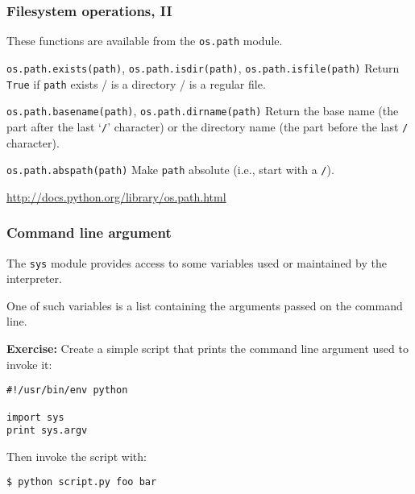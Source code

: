 \documentclass[english,serif,mathserif,xcolor=pdftex,dvipsnames,table]{beamer}
\begin{document}
\begin{frame}[fragile]
  \frametitle{Filesystem operations, II}
  These functions are available from the \texttt{os.path} module.

  \begin{describe}{\lstinline|os.path.exists(path)|,
      \lstinline|os.path.isdir(path)|}, \lstinline|os.path.isfile(path)|
    Return \texttt{True} if \texttt{path} exists / is a directory / is
    a regular file.
  \end{describe}

  \begin{describe}{\lstinline|os.path.basename(path)|,
      \lstinline|os.path.dirname(path)|}
    Return the base name (the part after the last `\texttt{/}'
    character) or the directory name (the part before the last
    \texttt{/} character).
  \end{describe}

  \begin{describe}{\lstinline|os.path.abspath(path)|}
    Make \texttt{path} absolute (i.e., start with a \texttt{/}).
  \end{describe}

  \begin{references}
    \url{http://docs.python.org/library/os.path.html}
  \end{references}
\end{frame}


\begin{frame}[fragile]
  \frametitle{Command line argument}
  The \texttt{sys} module provides access to some variables used or
  maintained by the interpreter.

  One of such variables is a list containing the arguments passed on
  the command line.

  \textbf{Exercise:} Create a simple script that
  prints the command line argument used to invoke it:

  \begin{lstlisting}
#!/usr/bin/env python

import sys
print sys.argv
  \end{lstlisting}

\+
Then invoke the script with:

\begin{lstlisting}
$ python script.py foo bar
\end{lstlisting}
\end{frame}
\end{document}
